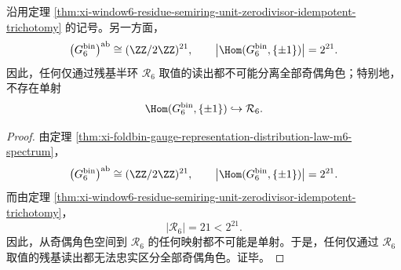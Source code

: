\begin{corollary}\label{cor:xi-window6-residue-semiring-parity-character-gap}
沿用定理 \ref{thm:xi-window6-residue-semiring-unit-zerodivisor-idempotent-trichotomy} 的记号。另一方面，
\[
\bigl(G_6^{\mathrm{bin}}\bigr)^{\mathrm{ab}}\cong (\ZZ/2\ZZ)^{21},
\qquad
\bigl|\Hom(G_6^{\mathrm{bin}},\{\pm 1\})\bigr|=2^{21}.
\]
因此，任何仅通过残基半环 \(\mathcal R_6\) 取值的读出都不可能分离全部奇偶角色；特别地，不存在单射
\[
\Hom(G_6^{\mathrm{bin}},\{\pm 1\})\hookrightarrow \mathcal R_6.
\]
\end{corollary}
\begin{proof}
由定理 \ref{thm:xi-foldbin-gauge-representation-distribution-law-m6-spectrum}，
\[
\bigl(G_6^{\mathrm{bin}}\bigr)^{\mathrm{ab}}\cong (\ZZ/2\ZZ)^{21},
\qquad
\bigl|\Hom(G_6^{\mathrm{bin}},\{\pm 1\})\bigr|=2^{21}.
\]
而由定理 \ref{thm:xi-window6-residue-semiring-unit-zerodivisor-idempotent-trichotomy}，
\[
|\mathcal R_6|=21<2^{21}.
\]
因此，从奇偶角色空间到 \(\mathcal R_6\) 的任何映射都不可能是单射。于是，任何仅通过 \(\mathcal R_6\) 取值的残基读出都无法忠实区分全部奇偶角色。证毕。
\end{proof}

\endinput
